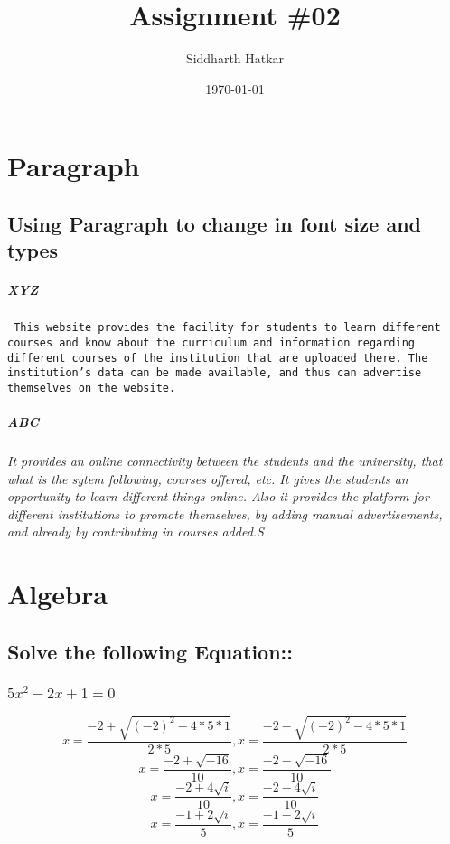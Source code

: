 \documentclass{report}
\title{Assignment \#02}
\date{\today}
\author{Siddharth Hatkar}
\begin{document}
	{\huge
	\maketitle
	}
	\newpage
	\tableofcontents
	\chapter{Paragraph}
	\section{\large{Using Paragraph to change in font size and types}}
	\paragraph{XYZ}
	\texttt{
		This website provides the facility for students to learn different courses and know about the curriculum and information regarding different courses of the institution that are uploaded there. The institution’s data can be made available, and thus can advertise themselves on the website.
	}
	\paragraph{ABC}
	\textit{\small
		 It provides an online connectivity between the students and the university, that what is the sytem following, courses offered, etc. It gives the students an opportunity to learn different things online. Also it provides the platform for different institutions to promote themselves, by adding manual advertisements, and already by contributing in courses added.S
	}
	\newline
	\chapter{Algebra}
	\section{\large{Solve the following Equation:: }}
	\subsection{$5x^2 -2x+ 1 = 0$}
		
		$$x = \frac{-2+\sqrt{(-2)^2-4*5*1}}{2*5} , x = \frac{-2-\sqrt{(-2)^2-4*5*1}}{2*5}$$
		\newline \newline
		$$x = \frac{-2+\sqrt{-16}}{10} , x = \frac{-2-\sqrt{-16}}{10}$$
		\newline \newline
		$$x = \frac{-2+4\sqrt{i}}{10} , x = \frac{-2-4\sqrt{i}}{10}$$
		\newline \newline
		$$x = \frac{-1+2\sqrt{i}}{5} , x = \frac{-1-2\sqrt{i}}{5}$$
		\newline \newline
	
\end{document}
